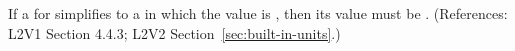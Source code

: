 If a \UnitDefinition for  simplifies to a \Unit in which the
  value is , then its  
value must be . (References: L2V1 Section 4.4.3; L2V2
Section~\ref{sec:built-in-units}.)
